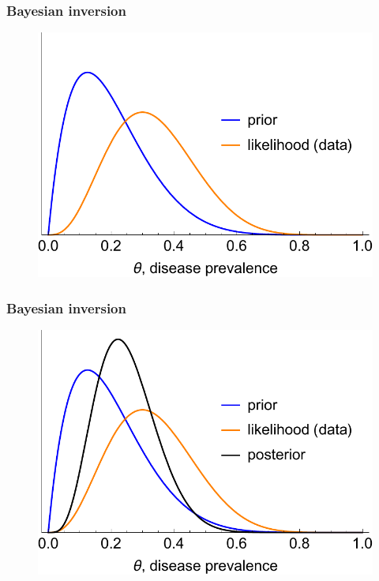 \documentclass[handout]{beamer}
\begin{document}
\begin{frame}
	\frametitle{Bayesian inversion}
	
	\begin{figure}[ht]
		\centerline{\includegraphics[width=\textwidth]{animations_figures/binomial_likelihood.pdf}}
	\end{figure}
	
\end{frame}

\begin{frame}
	\frametitle{Bayesian inversion}
	
	\begin{figure}[ht]
		\centerline{\includegraphics[width=\textwidth]{animations_figures/binomial_posterior.pdf}}
	\end{figure}
	
\end{frame}
\end{document}
